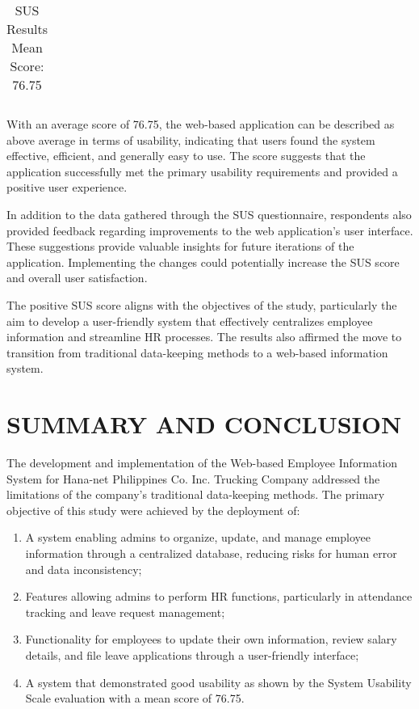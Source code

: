 \documentclass{icsthesis}
\begin{document}
\begin{mainmatter}
\begin{table}[H]
\begin{tabular}{|c |c |c |c |c |c |c |c |c |c |c |c|}
\end{tabular}
\caption{SUS Results
Mean Score: 76.75}
\label{tab:my_table}
\end{table}
With an average score of 76.75, the web-based application can be described as above average in terms of usability, indicating that users found the system effective, efficient, and generally easy to use. The score suggests that the application successfully met the primary usability requirements and provided a positive user experience.

In addition to the data gathered through the SUS questionnaire, respondents also provided feedback regarding improvements to the web application's user interface. These suggestions provide valuable insights for future iterations of the application. Implementing the changes could potentially increase the SUS score and overall user satisfaction.

The positive SUS score aligns with the objectives of the study, particularly the aim to develop a user-friendly system that effectively centralizes employee information and streamline HR processes. The results also affirmed the move to transition from traditional data-keeping methods to a web-based information system.

		
		\section{SUMMARY AND CONCLUSION}
			The development and implementation of the Web-based Employee Information System for Hana-net Philippines Co. Inc. Trucking Company addressed the limitations of the company's traditional data-keeping methods. The primary objective of this study were achieved by the deployment of: 
\begin{enumerate}
    \item A system enabling admins to organize, update, and manage employee information through a centralized database, reducing risks for human error and data inconsistency;
    \item Features allowing admins to perform HR functions, particularly in attendance tracking and leave request management;
    \item Functionality for employees to update their own information, review salary details, and file leave applications through a user-friendly interface;
    \item A system that demonstrated good usability as shown by the System Usability Scale evaluation with a mean score of 76.75.
\end{enumerate}


\end{mainmatter}
\end{document}
